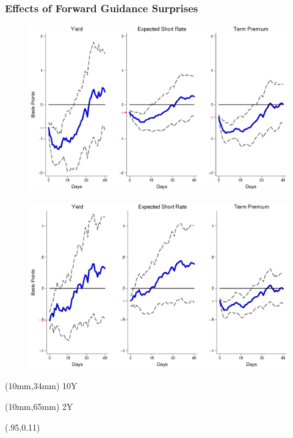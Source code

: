 \documentclass[12pt, aspectratio=169, xcolor=dvipsnames]{beamer}  %
\begin{document}
\begin{frame}[label=FGUS]
\frametitle{Effects of Forward Guidance Surprises}
\begin{figure}[!htbp]
\begin{center} %
	\includegraphics[trim={0cm 0cm 0cm 0cm},clip,height=0.4\textheight,width=0.85\linewidth]{../Figures/LPs/LagDep-FX/Path/US/DCMP/PathUSDnomyptp120mPost.eps}
	\par\end{center}
\end{figure}
\vspace{-0.5cm}
\begin{figure}[!htbp]
\begin{center} %
	\includegraphics[trim={0cm 0cm 0cm 0.76cm},clip,height=0.4\textheight,width=0.85\linewidth]{../Figures/LPs/LagDep-FX/Path/US/DCMP/PathUSDnomyptp24mPost.eps}
	\par\end{center}
\end{figure}
\begin{textblock*}{8mm}(10mm,34mm)
\small 10Y
\end{textblock*}
\begin{textblock*}{8mm}(10mm,65mm)
\small 2Y
\end{textblock*}
\begin{textblock*}{5cm}(.95\textwidth,0.11\textheight)
	\hyperlink{FGEM}{}
\end{textblock*}
\end{frame}
\end{document}
